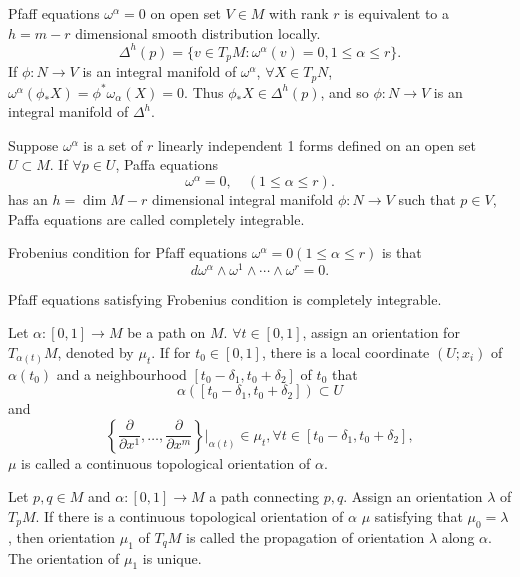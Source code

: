 \begin{newprop}
Pfaff equations $\omega^{\alpha} = 0$ on open set $V \in M$ with rank $r$ is equivalent to a $h=m-r$ dimensional smooth distribution locally.
\[\Delta^h(p) = \{v \in T_pM:\omega^{\alpha}(v)=0,1 \le \alpha \le r \}.\]
If $\phi:N \to V$ is an integral manifold of $\omega^{\alpha}$, $\forall X \in T_pN$, $\omega^{\alpha}(\phi_{*}X) = \phi^* \omega_{\alpha}(X) = 0$. Thus $\phi_* X \in \Delta^h(p)$, and so $\phi:N \to V$ is an integral manifold of $\Delta^h$.
\end{newprop}

\begin{newdef}
Suppose $\omega^{\alpha}$ is a set of $r$ linearly independent 1 forms defined on an open set $U \subset M$. If $\forall p \in U$,  Paffa equations
\[\omega^{\alpha} = 0 , \quad (1 \leq \alpha \leq r).\]
has an $h = \dim M -r$ dimensional integral manifold $\phi: N \to V$ such that $p \in V$, Paffa equations are called completely integrable.
\end{newdef}     

\begin{newdef}
Frobenius condition for Pfaff equations $\omega^{\alpha} =0(1 \le \alpha \le r)$ is that
\[d\omega^{\alpha} \wedge \omega^1 \wedge \cdots \wedge \omega^r = 0.\]
\end{newdef}

\begin{newthem}
Pfaff equations satisfying Frobenius condition is completely integrable.
\end{newthem}

\begin{newdef}
Let $\alpha:[0,1] \to M$ be a path on $M$. $\forall t \in [0,1]$, assign an orientation for $T_{\alpha(t)}M$, denoted by $\mu_t$. If for $t_0 \in [0,1]$, there is a local coordinate $(U;x_i)$ of $\alpha(t_0)$ and a neighbourhood $[t_0-\delta_1,t_0+\delta_2]$ of $t_0$ that
\[\alpha([t_0-\delta_1,t_0+\delta_2]) \subset U\] 
and
\[\left\{ \frac{\partial}{\partial x^1},\ldots,\frac{\partial}{\partial x^m}\right\}|_{\alpha(t)} \in \mu_t,\forall t \in [t_0-\delta_1,t_0+\delta_2],\] 
$\mu$ is called a continuous topological orientation of $\alpha$.
\end{newdef}

\begin{newdef}
Let $p,q \in M$ and $\alpha:[0,1] \to M$ a path connecting $p,q$. Assign an orientation $\lambda$ of $T_pM$. If there is a continuous topological orientation of $\alpha$ $\mu$ satisfying that $\mu_0 = \lambda$, then orientation $\mu_1$ of $T_qM$ is called the propagation of orientation $\lambda$ along $\alpha$. The orientation of $\mu_1$ is unique.
\end{newdef}

